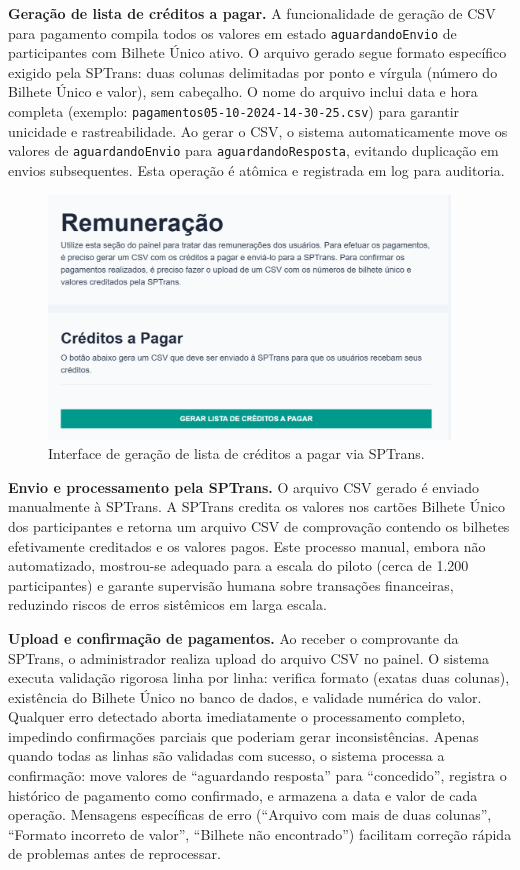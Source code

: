 \textbf{Geração de lista de créditos a pagar.} A funcionalidade de geração de CSV
para pagamento compila todos os valores em estado \texttt{aguardandoEnvio} de
participantes com Bilhete Único ativo. O arquivo gerado segue formato específico
exigido pela SPTrans: duas colunas delimitadas por ponto e vírgula (número do
Bilhete Único e valor), sem cabeçalho. O nome do arquivo inclui data e hora completa (exemplo:
\texttt{pagamentos05-10-2024-14-30-25.csv}) para garantir unicidade e
rastreabilidade. Ao gerar o CSV, o sistema automaticamente move os valores de
\texttt{aguardandoEnvio} para \texttt{aguardandoResposta}, evitando duplicação em
envios subsequentes. Esta operação é atômica e registrada em log para auditoria.

\begin{figure}[H]
    \centering
    \includegraphics[width=0.95\textwidth]{figuras/remuneracao_creditos.png}
    \caption{Interface de geração de lista de créditos a pagar via SPTrans.}
    \label{fig:remuneracao_gerar_csv_form_creditos}
  \end{figure}

\textbf{Envio e processamento pela SPTrans.} O arquivo CSV gerado é enviado
manualmente à SPTrans. A SPTrans credita os valores nos cartões Bilhete
Único dos participantes e retorna um arquivo CSV de comprovação contendo os bilhetes
efetivamente creditados e os valores pagos. Este processo manual, embora não
automatizado, mostrou-se adequado para a escala do piloto (cerca de 1.200
participantes) e garante supervisão humana sobre transações financeiras, reduzindo
riscos de erros sistêmicos em larga escala.



\textbf{Upload e confirmação de pagamentos.} Ao receber o comprovante da SPTrans,
o administrador realiza upload do arquivo CSV no painel. O sistema executa validação
rigorosa linha por linha: verifica formato (exatas duas colunas), existência do
Bilhete Único no banco de dados, e validade numérica do valor. Qualquer erro
detectado aborta imediatamente o processamento completo, impedindo confirmações
parciais que poderiam gerar inconsistências. Apenas quando todas as linhas são
validadas com sucesso, o sistema processa a confirmação: move valores de
``aguardando resposta'' para ``concedido'', registra o histórico de pagamento como confirmado, e armazena a data e valor de cada operação. Mensagens específicas de erro (``Arquivo com
mais de duas colunas'', ``Formato incorreto de valor'', ``Bilhete não encontrado'')
facilitam correção rápida de problemas antes de reprocessar.

